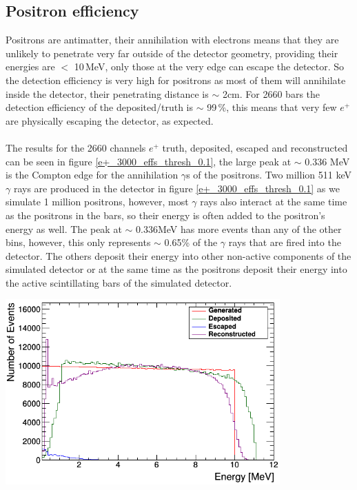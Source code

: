 \documentclass[12pt,a4paper]{article}
\newenvironment{Figure}
  {\par\medskip\noindent\minipage{\linewidth}}
  {\endminipage\par\medskip}
\begin{document}
\subsection{Positron efficiency}
Positrons are antimatter, their annihilation with electrons means that they are unlikely to penetrate very far outside of the detector geometry, providing their energies are $<$ 10\,MeV, only those at the very edge can escape the detector. So the detection efficiency is very high for positrons as most of them will annihilate inside the detector, their penetrating distance is $\sim$ 2cm. For 2660 bars the detection efficiency of the deposited/truth is $\sim$ 99\,\%, this means that very few $e^+$ are physically escaping the detector, as expected. 
\\\\ The results for the 2660 channels $e^+$ truth, deposited, escaped and reconstructed can be seen in figure \ref{e+_3000_effs_thresh_0.1}, the large peak at $\sim$ 0.336 MeV is the Compton edge for the annihilation $\gamma$s of the positrons. Two million 511 keV $\gamma$ rays are produced in the detector in figure \ref{e+_3000_effs_thresh_0.1} as we simulate 1 million positrons, however, most $\gamma$ rays also interact at the same time as the positrons in the bars, so their energy is often added to the positron's energy as well. The peak at $\sim$ 0.336MeV has more events than any of the other bins, however, this only represents $\sim$ 0.65\% of the $\gamma$ rays that are fired into the detector. The others deposit their energy into other non-active components of the simulated detector or at the same time as the positrons deposit their energy into the active scintillating bars of the simulated detector.

\begin{Figure}
 \centering
 \includegraphics[height=71mm]{truth_inside_outside_and_seen_e+_thresh0_1.png}
 \label{e+_3000_effs_thresh_0.1}
\end{Figure}
\end{document}
